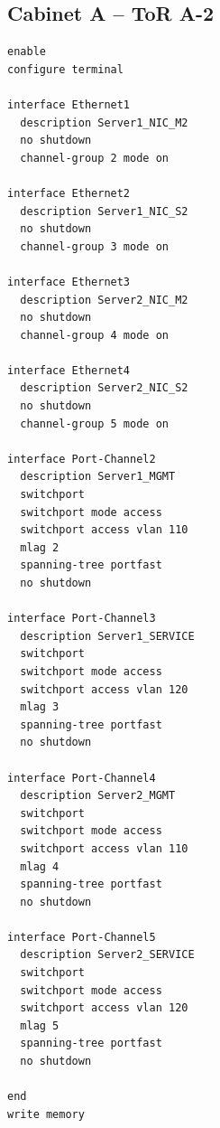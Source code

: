 \subsection{Cabinet A -- ToR A-2}
\begin{lstlisting}[caption={ToR A-2: downlinks to Servers 1 and 2 (backup NICs).},basicstyle=\ttfamily\footnotesize,breaklines=true]
enable
configure terminal

interface Ethernet1
  description Server1_NIC_M2
  no shutdown
  channel-group 2 mode on

interface Ethernet2
  description Server1_NIC_S2
  no shutdown
  channel-group 3 mode on

interface Ethernet3
  description Server2_NIC_M2
  no shutdown
  channel-group 4 mode on

interface Ethernet4
  description Server2_NIC_S2
  no shutdown
  channel-group 5 mode on

interface Port-Channel2
  description Server1_MGMT
  switchport
  switchport mode access
  switchport access vlan 110
  mlag 2
  spanning-tree portfast
  no shutdown

interface Port-Channel3
  description Server1_SERVICE
  switchport
  switchport mode access
  switchport access vlan 120
  mlag 3
  spanning-tree portfast
  no shutdown

interface Port-Channel4
  description Server2_MGMT
  switchport
  switchport mode access
  switchport access vlan 110
  mlag 4
  spanning-tree portfast
  no shutdown

interface Port-Channel5
  description Server2_SERVICE
  switchport
  switchport mode access
  switchport access vlan 120
  mlag 5
  spanning-tree portfast
  no shutdown

end
write memory
\end{lstlisting}

